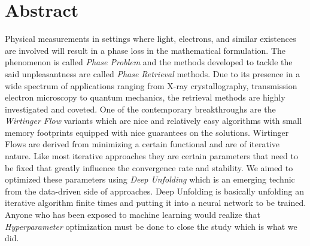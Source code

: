 \chapter*{Abstract}

Physical measurements in settings where light, electrons, and similar existences are involved will result in a phase loss in the
mathematical formulation. The phenomenon is called \emph{Phase Problem} and the methods developed to tackle the said unpleasantness
are called \emph{Phase Retrieval} methods. Due to its presence in a wide spectrum of applications ranging from X-ray crystallography, 
transmission electron microscopy to quantum mechanics, the retrieval methods are highly investigated and coveted. One of the contemporary 
breakthroughs are the \emph{Wirtinger Flow} variants which are nice and relatively easy algorithms with small memory footprints equipped with nice 
guarantees on the solutions. Wirtinger Flows are derived from minimizing a certain functional and are of iterative nature. Like most 
iterative approaches they are certain parameters that need to be fixed that greatly influence the convergence rate and stability. We aimed 
to optimized these parameters using \emph{Deep Unfolding} which is an emerging technic from the data-driven side of approaches. Deep Unfolding 
is basically unfolding an iterative algorithm finite times and putting it into a neural network to be trained. Anyone who has been exposed 
to machine learning would realize that \emph{Hyperparameter} optimization must be done to close the study which is what we did.       


\endinput